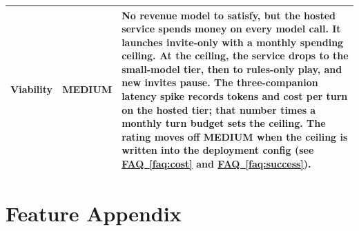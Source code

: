 \documentclass[11pt,letterpaper]{article}
\newcommand{\faqref}[1]{\hyperref[#1]{FAQ~\ref*{#1}}}
\begin{document}
\begin{tabularx}{\textwidth}{@{} l l X @{}}
Viability  & \textcolor{RiskAmber}{MEDIUM} & No revenue model to satisfy, but the hosted service spends money on every model call. It launches invite-only with a monthly spending ceiling. At the ceiling, the service drops to the small-model tier, then to rules-only play, and new invites pause. The three-companion latency spike records tokens and cost per turn on the hosted tier; that number times a monthly turn budget sets the ceiling. The rating moves off MEDIUM when the ceiling is written into the deployment config (see \faqref{faq:cost} and \faqref{faq:success}). \\
\bottomrule
\end{tabularx}

\newpage
\section*{Feature Appendix}
\end{document}
